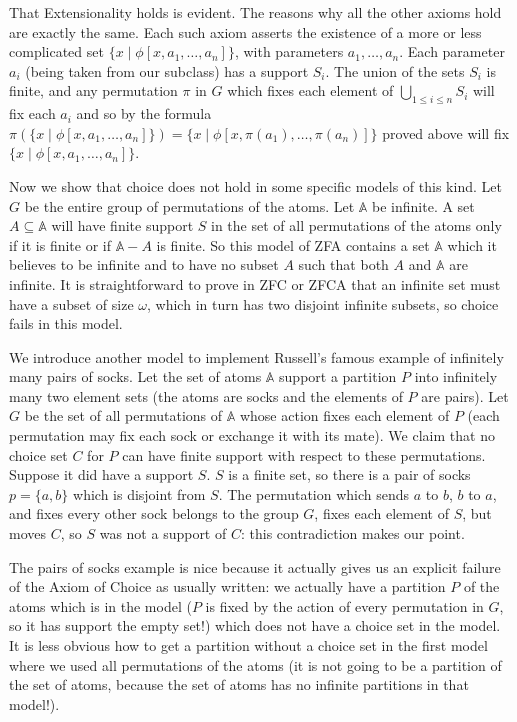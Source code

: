 \documentclass[12pt]{book}
\begin{document}
That Extensionality holds is evident.  The reasons why all the other axioms hold are exactly the same.  Each such axiom asserts the existence of a more or less complicated set
$\{x \mid \phi[x,a_1,\ldots,a_n]\}$, with parameters $a_1,\ldots,a_n$.  Each parameter $a_i$ (being taken from our subclass) has a support $S_i$.  The union of the sets $S_i$ is finite, and any permutation $\pi$ in $G$ which fixes each element of $\bigcup_{1 \leq i \leq n}S_i$ will fix each $a_i$ and so by the formula $\pi(\{x \mid \phi[x,a_1,\ldots,a_n]\}) = \{x \mid \phi[x,\pi(a_1),\ldots,\pi(a_n)]\}$ proved above will fix $\{x \mid \phi[x,a_1,\ldots,a_n]\}$.

Now we show that choice does not hold in some specific models of this kind.  Let $G$ be the entire group of permutations of the atoms.  Let $\mathbb A$ be infinite.  A set
$A \subseteq {\mathbb A}$ will have finite support $S$ in the set of all permutations of the atoms only if it is finite or if ${\mathbb A} - A$ is finite.  So this model of ZFA contains a
set $\mathbb A$ which it believes to be infinite and to have no subset $A$ such that both $A$ and $\mathbb A$ are infinite.  It is straightforward to prove in ZFC or ZFCA that an infinite set must have a subset of size $\omega$, which in turn has two disjoint infinite subsets, so choice fails in this model.

We introduce another model to implement Russell's famous example of infinitely many pairs of socks.  Let the set of atoms $\mathbb A$ support a partition $P$ into infinitely many two element sets (the atoms are socks and the elements of $P$ are pairs).  Let $G$ be the set of all permutations of $\mathbb A$ whose action fixes each element of $P$ (each permutation  may fix each sock or exchange it with its mate).  We claim that no choice set $C$ for $P$ can have finite support with respect to these permutations.  Suppose it did have a support $S$.  $S$ is a finite set, so there is a pair of socks $p=\{a,b\}$ which is disjoint from $S$.  The permutation which sends $a$ to $b$, $b$ to $a$, and fixes every other sock belongs to the group $G$, fixes each element of $S$, but moves $C$, so $S$ was not a support of $C$:  this contradiction makes our point.

The pairs of socks example is nice because it actually gives us an explicit failure of the Axiom of Choice as usually written:  we actually have a partition $P$ of the atoms which is in the model ($P$ is fixed by the action of every permutation in $G$, so it has support the empty set!) which does not have a choice set in the model.  It is less obvious how to get
a partition without a choice set in the first model where we used all permutations of the atoms (it is not going to be a partition of the set of atoms, because the set of atoms
has no infinite partitions in that model!).
\end{document}
